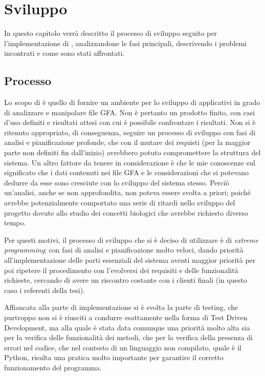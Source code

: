 \chapter{Sviluppo}
In questo capitolo verrà descritto il processo di sviluppo
seguito per l'implementazione di \pygfa, analizzandone le
fasi principali, descrivendo i problemi incontrati e come sono stati
affrontati.

\section{Processo}
Lo scopo di \pygfa è quello di fornire un ambiente per lo sviluppo
di applicativi in grado di analizzare e manipolare file GFA. Non
è pertanto un prodotto finito, con casi d'uso definiti e risultati attesi
con cui è possibile confrontare i risultati. Non si è ritenuto appropriato,
di conseguenza, seguire un processo di sviluppo con fasi di analisi
e pianificazione profonde, che con il mutare dei requisti (per la
maggior parte non definiti fin dall'inizio) avrebbero potuto
compromettere la struttura del sistema. Un altro fattore da
tenere in considerazione è che le mie conoscenze sul significato
che i dati contenuti nei file GFA e le considerazioni che si potevano dedurre
da esse sono cresciute con lo sviluppo del sistema stesso. Perciò un'analisi,
anche se non approfondita, non poteva essere svolta a priori; poiché
avrebbe potenzialmente comportato una serie di ritardi
nello sviluppo del progetto dovute allo studio dei concetti biologici
che avrebbe richiesto diverso tempo.


Per questi motivi, il processo di sviluppo che si è deciso di utilizzare è di \emph{extreme}
\emph{programming}; con fasi di analisi e pianificazione molto veloci,
dando priorità all'implementazione delle parti essenziali del sistema aventi
maggior priorità per poi ripetere il procedimento con l'evolversi dei
requisiti e delle funzionalità richieste, cercando di avere un riscontro
costante con i clienti finali (in questo caso i referenti della tesi).

Affiancata alla parte di implementazione si è svolta la parte di testing,
che purtroppo non si è riusciti a condurre esattamente nella forma di Test Driven
Development, ma alla quale è stata data comunque una priorità molto alta
sia per la verifica delle funzionalità dei metodi, che per la verifica della
presenza di errori nel codice, che nel contesto di un linguaggio non compilato,
quale è il Python, risulta una pratica molto importante per garantire il
corretto funzionamento del programma.

